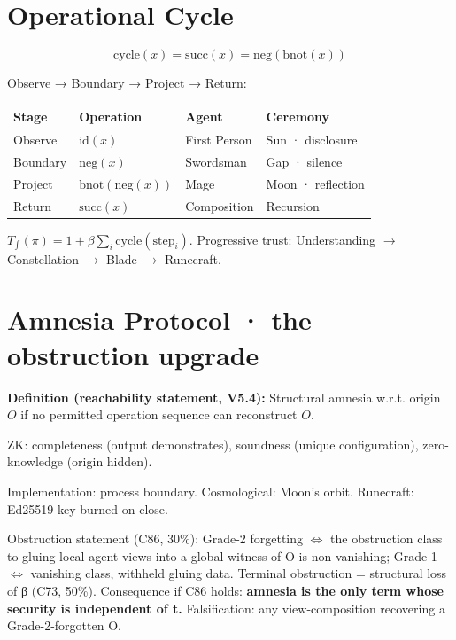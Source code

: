\documentclass[
]{article}
\newcounter{none} %
\begin{document}
\section{Operational Cycle}\label{operational-cycle}

\[\text{cycle}(x) = \text{succ}(x) = \text{neg}(\text{bnot}(x))\]

Observe → Boundary → Project → Return:

{\def\LTcaptype{none} %
\begin{longtable}[]{@{}llll@{}}
\toprule\noalign{}
Stage & Operation & Agent & Ceremony \\
\midrule\noalign{}
\endhead
\bottomrule\noalign{}
\endlastfoot
Observe & \(\text{id}(x)\) & First Person & Sun · disclosure \\
Boundary & \(\text{neg}(x)\) & Swordsman & Gap · silence \\
Project & \(\text{bnot}(\text{neg}(x))\) & Mage & Moon · reflection \\
Return & \(\text{succ}(x)\) & Composition & Recursion \\
\end{longtable}
}

\(T_{\!\int}(\pi) = 1 + \beta \sum_i \text{cycle}(\text{step}_i)\).
Progressive trust: Understanding \(\to\) Constellation \(\to\) Blade
\(\to\) Runecraft.

\section{Amnesia Protocol · the obstruction
upgrade}\label{amnesia-protocol-the-obstruction-upgrade}

\textbf{Definition (reachability statement, V5.4):} Structural amnesia
w.r.t. origin \(O\) if no permitted operation sequence can reconstruct
\(O\).

ZK: completeness (output demonstrates), soundness (unique
configuration), zero-knowledge (origin hidden).

Implementation: process boundary. Cosmological: Moon's orbit. Runecraft:
Ed25519 key burned on close.

Obstruction statement (C86, 30\%): Grade-2 forgetting \(\iff\) the
obstruction class to gluing local agent views into a global witness of O
is non-vanishing; Grade-1 \(\iff\) vanishing class, withheld gluing
data. Terminal obstruction = structural loss of β (C73, 50\%).
Consequence if C86 holds: \textbf{amnesia is the only term whose
security is independent of t.} Falsification: any view-composition
recovering a Grade-2-forgotten O.
\end{document}
